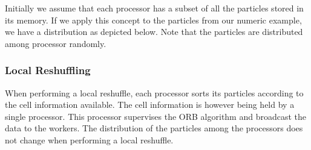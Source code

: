 \documentclass[]{article}
\begin{document}
Initially we assume that each processor has a subset of all the particles stored in its memory. If we apply this concept to the particles from our numeric example, we have a distribution as depicted below. Note that the particles are distributed among processor randomly.


\begin{figure}[ht]
	
	\centering
	
\end{figure}

\subsubsection{Local Reshuffling}

When performing a local reshuffle, each processor sorts its particles according to the cell information available. The cell information is however being held by a single processor. This processor supervises the ORB algorithm and broadcast the data to the workers. The distribution of the particles among the processors does not change when performing a local reshuffle.
\end{document}
